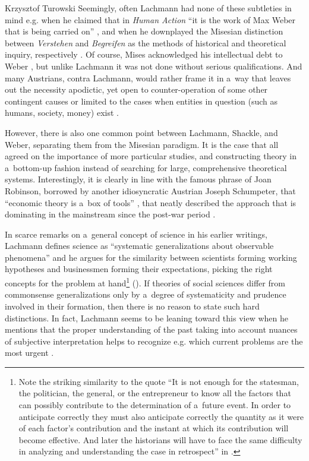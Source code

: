 \begin{artengenv}{Krzysztof Turowski}
Seemingly, often Lachmann had none of these subtleties in mind e.g. when he claimed that in \emph{Human Action} ``it is the work of Max Weber that is being carried on'' \parencite[95]{lachmann-ha}, and when he downplayed the Misesian distinction between \emph{Verstehen} and \emph{Begreifen} as the methods of historical and theoretical inquiry, respectively \parencite[49]{lachmann-significance}.
Of course, Mises acknowledged his intellectual debt to Weber \parencite[79]{mises-epe}, but unlike Lachmann it was not done without serious qualifications.
And many Austrians, contra Lachmann, would rather frame it in a~way that leaves out the necessity apodictic, yet open to counter-operation of some other contingent causes or limited to the cases when entities in question (such as humans, society, money) exist \parencite[57]{rothbard-present}.

However, there is also one common point between Lachmann, Shackle, and Weber, separating them from the Misesian paradigm.
It is the case that all agreed on the importance of more particular studies, and constructing theory in a~bottom-up fashion instead of searching for large, comprehensive theoretical systems.
Interestingly, it is clearly in line with the famous phrase of Joan Robinson, borrowed by another idiosyncratic Austrian Joseph Schumpeter, that ``economic theory is a~box of tools'' \parencite[15]{schumpeter-history}, that neatly described the approach that is dominating in the mainstream since the post-war period \parencite{morgan,rodrik}.

In scarce remarks on a~general concept of science in his earlier writings, Lachmann defines science as ``systematic generalizations about observable
phenomena'' \parencite[166]{lachmann-science} and he argues for the similarity between scientists forming working hypotheses and businessmen forming their expectations, picking the right concepts for the problem at hand\footnote{Note the striking similarity to the quote ``It is not enough for the statesman, the politician, the general, or the entrepreneur to know all the factors that can possibly contribute to the determination of a~future event. In order to anticipate correctly they must also anticipate correctly the quantity as it were of each factor's contribution and the instant at which its contribution will become effective. And later the historians will have to face the same difficulty in analyzing and understanding the case in retrospect'' in \textcite[314--315]{mises-theory}.} (\cite[90, 93]{lachmann-shackle-time}). If theories of social sciences differ from commonsense generalizations only by a~degree of systematicity and prudence involved in their formation, then there is no reason to state such hard distinctions.
In fact, Lachmann seems to be leaning toward this view when he mentions that the proper understanding of the past taking into account nuances of subjective interpretation helps to recognize e.g. which current problems are the most urgent \parencite[240]{lachmann-hermeneutic}.


\end{artengenv}
